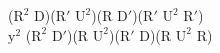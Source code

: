 ($\text{R}^2$ D)($\text{R}'$ $\text{U}^2$)(R $\text{D}'$)($\text{R}'$ $\text{U}^2$ $\text{R}'$)\\
$\text{y}^2$ ($\text{R}^2$ $\text{D}'$)(R $\text{U}^2$)($\text{R}'$ D)(R $\text{U}^2$ R)\\
